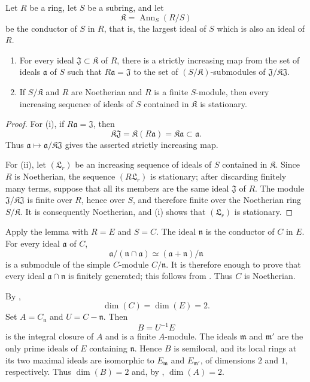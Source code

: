 \begin{example}[5.6.11]
\begin{lemma}[5.6.11.1]
\label{IV.5.6.11.1}
Let $R$ be a ring, let $S$ be a subring, and let
\[
\mathfrak K=\operatorname{Ann}_S(R/S)
\]
be the conductor of $S$ in $R$, that is, the largest ideal of $S$
which is also an ideal of $R$.
\begin{enumerate}[{\rm(i)}]
\item
{}
\label{IV.5.6.11.1.i}
For every ideal $\mathfrak J\subset\mathfrak K$ of $R$, there is a
strictly increasing map from the set of ideals $\mathfrak a$ of $S$
such that $R\mathfrak a=\mathfrak J$ to the set of
$(S/\mathfrak K)$-submodules of
$\mathfrak J/\mathfrak K\mathfrak J$.

\item
{}
\label{IV.5.6.11.1.ii}
If $S/\mathfrak K$ and $R$ are Noetherian and $R$ is a finite
$S$-module, then every increasing sequence of ideals of $S$
contained in $\mathfrak K$ is stationary.
\end{enumerate}
\end{lemma}

\begin{proof}
For (i), if $R\mathfrak a=\mathfrak J$, then
\[
\mathfrak K\mathfrak J
 =\mathfrak K(R\mathfrak a)
 =\mathfrak K\mathfrak a
 \subset\mathfrak a.
\]
Thus $\mathfrak a\mapsto
\mathfrak a/\mathfrak K\mathfrak J$ gives the asserted strictly
increasing map.

For (ii), let $(\mathfrak L_r)$ be an increasing sequence of ideals
of $S$ contained in $\mathfrak K$.  Since $R$ is Noetherian, the
sequence $(R\mathfrak L_r)$ is stationary; after discarding finitely
many terms, suppose that all its members are the same ideal
$\mathfrak J$ of $R$.  The module
$\mathfrak J/\mathfrak K\mathfrak J$ is finite over $R$, hence over
$S$, and therefore finite over the Noetherian ring
$S/\mathfrak K$.  It is consequently Noetherian, and (i) shows that
$(\mathfrak L_r)$ is stationary.
\end{proof}

Apply the lemma with $R=E$ and $S=C$.  The ideal $\mathfrak n$ is
the conductor of $C$ in $E$.  For every ideal $\mathfrak a$ of $C$,
\[
\mathfrak a/(\mathfrak n\cap\mathfrak a)
 \simeq(\mathfrak a+\mathfrak n)/\mathfrak n
\]
is a submodule of the simple $C$-module $C/\mathfrak n$.  It is
therefore enough to prove that every ideal
$\mathfrak a\cap\mathfrak n$ is finitely generated; this follows
from .  Thus $C$ is Noetherian.

By ,
\[
\dim(C)=\dim(E)=2.
\]
Set $A=C_{\mathfrak n}$ and $U=C-\mathfrak n$.  Then
\[
B=U^{-1}E
\]
is the integral closure of $A$ and is a finite $A$-module.  The
ideals $\mathfrak m$ and $\mathfrak m'$ are the only prime ideals of
$E$ containing $\mathfrak n$.  Hence $B$ is semilocal, and its local
rings at its two maximal ideals are isomorphic to
$E_{\mathfrak m}$ and $E_{\mathfrak m'}$, of dimensions $2$ and
$1$, respectively.  Thus $\dim(B)=2$ and, by
, $\dim(A)=2$.


\end{example}

